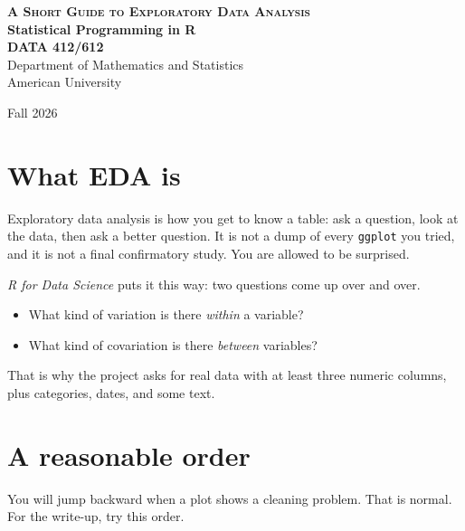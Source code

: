 \documentclass[11pt, a4paper]{article}
\begin{document}
\begin{center}
{\Large \textsc{\textbf{A Short Guide to Exploratory Data Analysis}}}
\\ \textbf{Statistical Programming in R}\\ \textbf{DATA 412/612} \\
Department of Mathematics and Statistics
\\
American University
\end{center}
\begin{center}
Fall 2026
\end{center}

\section*{What EDA is}

Exploratory data analysis is how you get to know a table: ask a question, look at the data, then ask a better question. It is not a dump of every \texttt{ggplot} you tried, and it is not a final confirmatory study. You are allowed to be surprised.

\emph{R for Data Science} puts it this way: two questions come up over and over.
\begin{itemize}
    \item What kind of variation is there \emph{within} a variable?
    \item What kind of covariation is there \emph{between} variables?
\end{itemize}
That is why the project asks for real data with at least three numeric columns, plus categories, dates, and some text.

\section*{A reasonable order}

You will jump backward when a plot shows a cleaning problem. That is normal. For the write-up, try this order.
\end{document}
